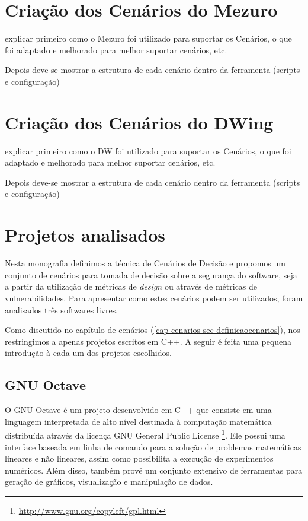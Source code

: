 \section{Criação dos Cenários do Mezuro}
\label{mezuro-cenarios}

explicar primeiro como o Mezuro foi utilizado para suportar os Cenários, o que foi adaptado e melhorado para melhor suportar cenários, etc.

Depois deve-se mostrar a estrutura de cada cenário dentro da ferramenta (scripts e configuração)

\section{Criação dos Cenários do DWing}
\label{dw-cenarios}

explicar primeiro como o DW foi utilizado para suportar os Cenários, o que foi adaptado e melhorado para melhor suportar cenários, etc.

Depois deve-se mostrar a estrutura de cada cenário dentro da ferramenta (scripts e configuração)

\section{Projetos analisados}
\label{cap-projects}

Nesta monografia definimos a técnica de Cenários de Decisão e propomos um conjunto de cenários para tomada de decisão sobre a segurança do software, seja a partir da utilização de métricas de \emph{design} ou através de métricas de vulnerabilidades. Para apresentar como estes cenários podem ser utilizados, foram analisados três softwares livres. 

Como discutido no capítulo de cenários (\ref{cap-cenarios-sec-definicaocenarios}), nos restringimos a apenas projetos escritos em C++. A seguir é feita uma pequena introdução à cada um dos projetos escolhidos.

\subsection{GNU Octave}
\label{section-octave}

O GNU Octave é um projeto desenvolvido em C++ que consiste em uma linguagem interpretada de alto nível destinada à computação matemática distribuída através da licença GNU General Public License \footnote{\url{http://www.gnu.org/copyleft/gpl.html}}. Ele possui uma interface baseada em linha de comando para a solução de problemas matemáticas lineares e não lineares, assim como possibilita a execução de experimentos numéricos. Além disso, também provê um conjunto extensivo de ferramentas para geração de gráficos, visualização e manipulação de dados.

